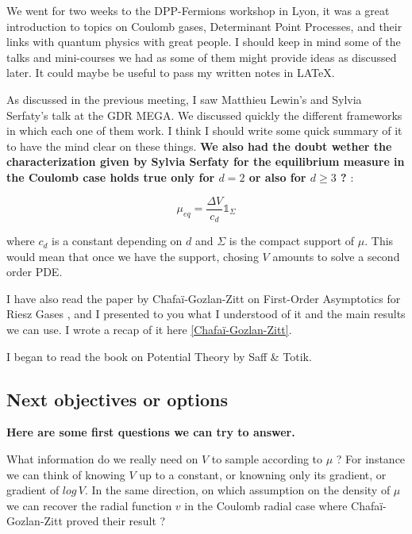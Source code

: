 \documentclass[a4paper,12pt]{report}
\begin{document}
We went for two weeks to the DPP-Fermions workshop in Lyon, it was a great introduction to topics on Coulomb gases, Determinant Point Processes, and their links with quantum physics with great people. I should keep in mind some of the talks and mini-courses we had as some of them might provide ideas as discussed later. It could maybe be useful to pass my written notes in LATeX.
\vspace{0.5cm}

As discussed in the previous meeting, I saw Matthieu Lewin's and Sylvia Serfaty's talk at the GDR MEGA. We discussed quickly the different frameworks in which each one of them work. I think I should write some quick summary of it to have the mind clear on these things. \textbf{We also had the doubt wether the characterization given by Sylvia Serfaty for the equilibrium measure in the Coulomb case holds true only for $d = 2$ or also for $d \geq 3$ ?} :

\[ \mu_{eq} = \frac{\Delta V}{c_d} \mathds{1}_{\Sigma}\]

where $c_d$ is a constant depending on $d$ and $\Sigma$ is the compact support of $\mu$. This would mean that once we have the support, chosing $V$ amounts to solve a second order PDE.
\vspace{0.5cm}

I have also read the paper by Chafaï-Gozlan-Zitt on First-Order Asymptotics for Riesz Gases \cite{chafai-gozlan-zitt}, and I presented to you what I understood of it and the main results we can use. I wrote a recap of it here \ref{Chafaï-Gozlan-Zitt}.
\vspace{0.5cm}

I began to read the book on Potential Theory by Saff \& Totik.


\subsection*{Next objectives or options}

\textbf{Here are some first questions we can try to answer.} 
\vspace{0.5cm}

What information do we really need on $V$ to sample according to $\mu$ ? For instance we can think of knowing $V$ up to a constant, or knowning only its gradient, or gradient of $log\, V$. In the same direction, on which assumption on the density of $\mu$ we can recover the radial function $v$ in the Coulomb radial case where Chafaï-Gozlan-Zitt proved their result ?
\vspace{0.5cm}
\end{document}
